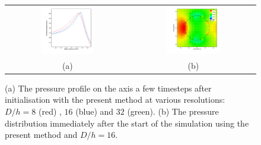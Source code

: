 \begin{figure}
\begin{center}
\begin{tabular}{cc}
\includegraphics[width=0.45\textwidth]{Figures/Sagar/pressure_rd_MC.png} &
\includegraphics[width=0.45\textwidth]
{Figures/Sagar/16ppd_pressure_corrected.png}\\
(a) & (b)
\end{tabular}
\end{center}
\caption{ (a) The pressure profile on the axis a few timesteps after 
initialisation with the present 
method at various resolutions: $D/h = 8$ (red) , $16$ (blue) and $32$ (green). 
(b) The pressure distribution immediately after the start of the simulation 
using the present method and   $D/h = 16$.}
\label{FengXiao_corrected}
\end{figure}

\vspace*{0.2cm}

